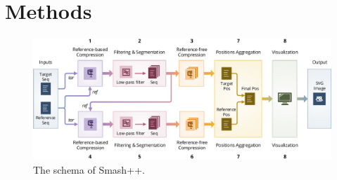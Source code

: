 \clearpage
\section{Methods}
\label{sec:methods}

\begin{figure}[!h]
\includegraphics[width=\linewidth]{schema.pdf}
\caption{The schema of Smash++.}
\label{fig1}
\end{figure}